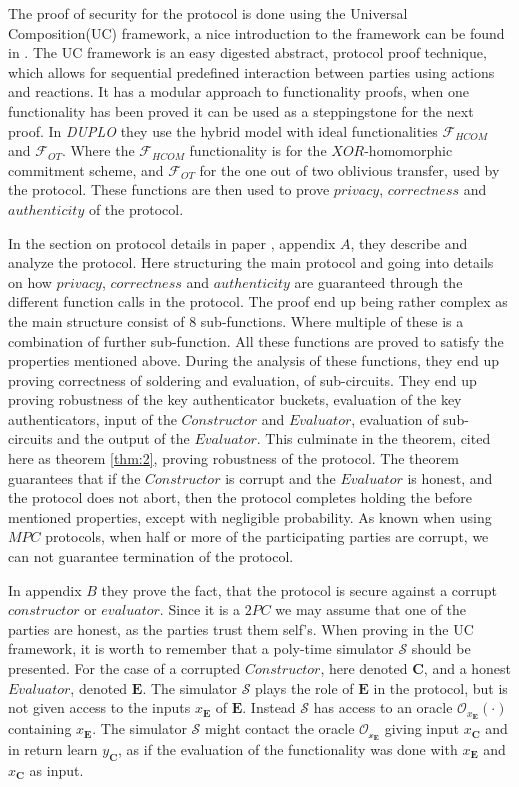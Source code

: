 \documentclass[twoside,11pt,openright]{report}
\newcommand{\DUPLO}{\textit{DUPLO} }
\begin{document}
\bigskip

The proof of security for the protocol is done using the Universal Composition(UC) framework, a nice introduction to the framework can be found in \cite{smcss}. The UC framework is an easy digested abstract, protocol proof technique, which allows for sequential predefined interaction between parties using actions and reactions. It has a modular approach to functionality proofs, when one functionality has been proved it can be used as a steppingstone for the next proof. In \DUPLO they use the hybrid model with ideal functionalities $\mathcal{F}_{HCOM}$ and $\mathcal{F}_{OT}$. Where the $\mathcal{F}_{HCOM}$ functionality is for the $XOR$-homomorphic commitment scheme, and $\mathcal{F}_{OT}$ for the one out of two oblivious transfer, used by the protocol. These functions are then used to prove $privacy$, $correctness$ and $authenticity$ of the protocol. 

In the section on protocol details in paper \cite{duplo}, appendix $A$, they describe and analyze the protocol. Here structuring the main protocol and going into details on how $privacy$, $correctness$ and $authenticity$ are guaranteed through the different function calls in the protocol. The proof end up being rather complex as the main structure consist of $8$ sub-functions. Where multiple of these is a combination of further sub-function. All these functions are proved to satisfy the properties mentioned above. During the analysis of these functions, they end up proving correctness of soldering and evaluation, of sub-circuits. They end up proving robustness of the key authenticator buckets, evaluation of the key authenticators, input of the $Constructor$ and $Evaluator$, evaluation of sub-circuits and the output of the $Evaluator$. This culminate in the theorem, cited here as theorem \ref{thm:2}, proving robustness of the protocol. The theorem guarantees that if the $Constructor$ is corrupt and the $Evaluator$ is honest, and the protocol does not abort, then the protocol completes holding the before mentioned properties, except with negligible probability. As known when using $MPC$ protocols, when half or more of the participating parties are corrupt, we can not guarantee termination of the protocol.

In appendix $B$ they prove the fact, that the protocol is secure against a corrupt $constructor$ or $evaluator$. Since it is a $2PC$ we may assume that one of the parties are honest, as the parties trust them self's. When proving in the UC framework, it is worth to remember that a poly-time simulator $\mathcal{S}$ should be presented. For the case of a corrupted $Constructor$, here denoted $\mathbf{C}$, and a honest $Evaluator$, denoted $\mathbf{E}$. The simulator $\mathcal{S}$ plays the role of $\mathbf{E}$ in the protocol, but is not given access to the inputs $x_{\mathbf{E}}$ of $\mathbf{E}$. Instead $\mathcal{S}$ has access to an oracle $\mathcal{O}_{x_{\mathbf{E}}}(\cdot)$ containing $x_{\mathbf{E}}$. The simulator $\mathcal{S}$ might contact the oracle $\mathcal{O_{x_{\mathbf{E}}}}$ giving input $x_{\mathbf{C}}$ and in return learn $y_{\mathbf{C}}$, as if the evaluation of the functionality was done with $x_{\mathbf{E}}$ and $x_{\mathbf{C}}$ as input.
\end{document}
